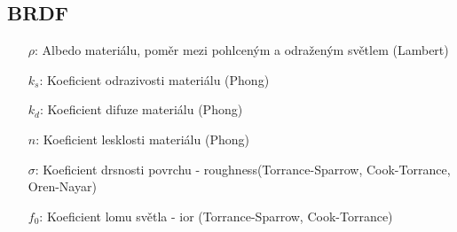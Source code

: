 \documentclass[czech,master,dept460,male,cpp,cpdeclaration]{diploma}
\newcommand{\alb}{\rho}
\newcommand{\rough}{\sigma}
\newcommand{\ior}{f_0}
\begin{document}
\subsection{BRDF}

\begin{itemize}
    \item[\(\alb\):] Albedo materiálu, poměr mezi pohlceným a odraženým světlem (Lambert)
    \item[\(k_s\):] Koeficient odrazivosti materiálu (Phong)
    \item[\(k_d\):] Koeficient difuze materiálu (Phong)
    \item[\(n\):] Koeficient lesklosti materiálu (Phong)
    \item[\(\rough\):] Koeficient drsnosti povrchu - roughness(Torrance-Sparrow, Cook-Torrance, Oren-Nayar)
    \item[\(\ior\):] Koeficient lomu světla - ior (Torrance-Sparrow, Cook-Torrance)
\end{itemize}
\end{document}
